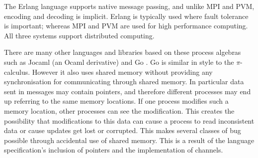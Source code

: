The Erlang language \citep{erlang} supports native message passing,
and unlike MPI and PVM, encoding and decoding is implicit.
Erlang is typically used where fault tolerance is important;
whereas MPI and PVM are used for high performance computing.
All three systems support distributed computing.


There are many other languages and libraries based on these process algebras
such as 
Jocaml \citep{jocaml} (an Ocaml
\citep{ml-types, ocaml-modules, ocaml-bytecode, ocaml-native}
derivative)
and Go \citep{google:2012:go}.
Go is similar in style to the $\pi$-calculus.
However it also uses shared memory without providing any synchronisation
for communicating through shared memory.
In particular data sent in messages may contain pointers,
and therefore different processes may end up referring to the same memory
locations.
If one process modifies such a memory location,
other processes can see the modification.
This creates the possibility that modifications to this data can 
cause a process to read inconsistent data or 
cause updates get lost or corrupted.
This makes several classes of bug possible through accidental use of
shared memory.
This is a result of the language specification's inclusion of pointers and
the implementation of channels.

